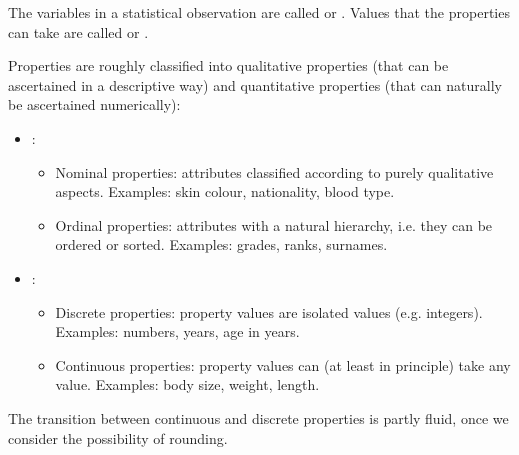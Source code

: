 \begin{MIntro}
\begin{MInfo}

The variables in a statistical observation are called  or .
Values that the properties can take are called  or 
.
\end{MInfo}

Properties are roughly classified into qualitative properties (that can be ascertained in a descriptive way) and quantitative properties 
(that can naturally be ascertained numerically):
\begin{itemize}
\item{:\begin{itemize}
  \item{Nominal properties: attributes classified according to purely qualitative aspects. Examples: 
  skin colour, nationality, blood type.}
  \item{Ordinal properties: attributes with a natural hierarchy, i.e. they can be ordered or sorted.
        Examples: grades, ranks, surnames.}
  \end{itemize}
  }
\item{:\begin{itemize}
  \item{Discrete properties: property values are isolated values (e.g. integers).
        Examples: numbers, years, age in years.}
  \item{Continuous properties: property values can (at least in principle) take any value. 
        Examples: body size, weight, length.}
  \end{itemize}
}
\end{itemize}

The transition between continuous and discrete properties is partly fluid, once we consider the possibility of rounding.
\end{MIntro}


